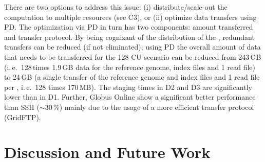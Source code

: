 \documentclass[conference]{IEEEtran}
\begin{document}
There are two options to address this issue: (i) distribute/scale-out
the computation to multiple resources (see C3), or (ii) optimize data
transfers using PD.  The optimization via PD in turn
has two components: amount transferred and transfer protocol.  By
being cognizant of the distribution of the \cus, redundant transfers
can be reduced (if not eliminated); using PD the overall
amount of data that needs to be transferred for the 128 CU scenario
can be reduced from 243\,GB (i.\,e.\ 128\,\cus times 1.9\,GB data for
the reference genome, index files and 1 read file) to 24\,GB (a single
transfer of the reference genome and index files and 1 read file per
\cu, i.\,e.\ 128 times 170\,MB).  The staging times in D2 and D3 are
significantly lower than in D1. Further, Globus Online show a
significant better performance than SSH ($\sim$30\,\%) mainly due to
the usage of a more efficient transfer protocol (GridFTP).




% 
% 



\section{Discussion and Future Work}
\label{sec:discussion-future-work}
\end{document}
